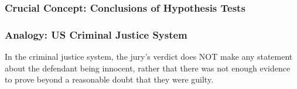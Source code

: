 \documentclass[handout]{beamer}
\newcommand{\blue}[1]{\textcolor{blue2}{#1}}
\begin{document}
\begin{frame}
\frametitle{Crucial Concept: Conclusions of Hypothesis Tests}

%
%
%
%

\end{frame}


\begin{frame}
\frametitle{Analogy:  US Criminal Justice System}

In the criminal justice system, the jury's verdict does NOT make any statement about the defendant being \blue{innocent}, rather that there was not enough evidence to prove beyond a reasonable doubt that they were guilty.

\end{frame}
\end{document}
